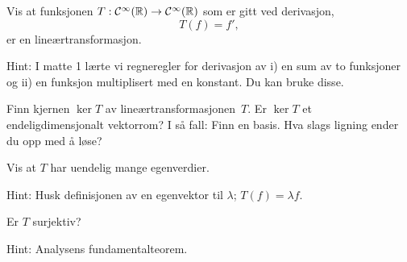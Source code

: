 \begin{oppgave}

\begin{punkt}
Vis at funksjonen $T:\mathcal{C}^\infty(\mathbb{R})\rightarrow \mathcal{C}^\infty(\mathbb{R})$ som er gitt ved derivasjon, $$T(f)=f',$$ er en lineærtransformasjon.

\noindent
Hint: I matte 1 lærte vi regneregler for derivasjon av i) en sum av to funksjoner og ii) en funksjon multiplisert med en konstant. Du kan bruke disse.
\end{punkt}

\begin{punkt}
Finn kjernen $\ker T$ av lineærtransformasjonen~$T$.
Er $\ker T$ et endeligdimensjonalt vektorrom?  I så fall: Finn en basis. Hva slags ligning ender du opp med å løse?
\end{punkt}

\begin{punkt}
Vis at $T$ har uendelig mange egenverdier.

\noindent 
Hint: Husk definisjonen av en egenvektor til $\lambda$; $T(f)=\lambda f$.
\end{punkt}

\begin{punkt}
Er $T$ surjektiv?

\noindent
Hint: Analysens fundamentalteorem.
\end{punkt}

\end{oppgave}

